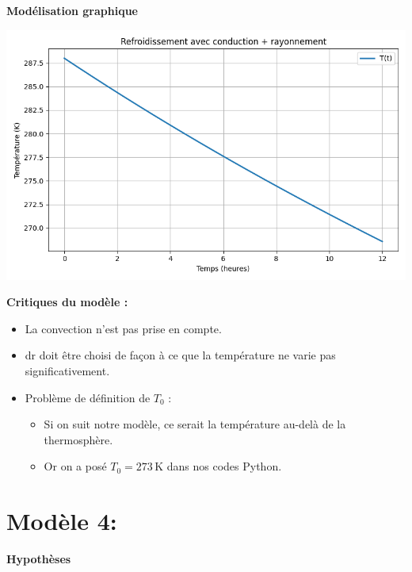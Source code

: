 \documentclass[a4paper,12pt]{article}
\begin{document}
\vspace{1cm}
\textbf{Modélisation graphique}
    
    \includegraphics[width=0.8\linewidth]{../modele3/figures/modele3_coquille-conduction-rayonnement.png}    

\vspace{1cm}
\textbf{Critiques du modèle :}
\begin{itemize}
    \item La convection n’est pas prise en compte.
    \item dr doit être choisi de façon à ce que la température ne varie pas significativement.
    \item Problème de définition de $T_0$ :
    \begin{itemize}
        \item Si on suit notre modèle, ce serait la température au-delà de la thermosphère.
        \item Or on a posé $T_0 = 273\, \mathrm{K}$ dans nos codes Python. 
    
    \end{itemize}
\end{itemize}
\section{Modèle 4: }
\textbf{Hypothèses}
\end{document}
